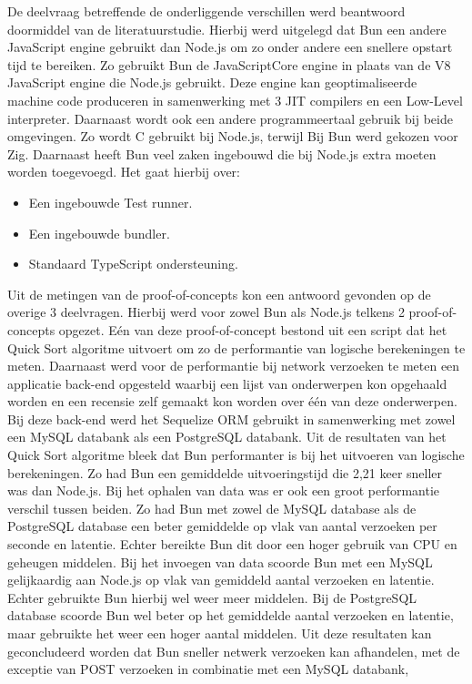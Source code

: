 De deelvraag betreffende de onderliggende verschillen werd beantwoord doormiddel van de literatuurstudie.
Hierbij werd uitgelegd dat Bun een andere JavaScript engine gebruikt dan Node.js om zo onder andere een snellere opstart tijd te bereiken.
Zo gebruikt Bun de JavaScriptCore engine in plaats van de V8 JavaScript engine die Node.js gebruikt.
Deze engine kan geoptimaliseerde machine code produceren in samenwerking met 3 JIT compilers en een Low-Level interpreter.
Daarnaast wordt ook een andere programmeertaal gebruik bij beide omgevingen. Zo wordt C gebruikt bij Node.js, terwijl Bij Bun werd gekozen voor Zig.
Daarnaast heeft Bun veel zaken ingebouwd die bij Node.js extra moeten worden toegevoegd.
Het gaat hierbij over:
\begin{itemize}
    \item Een ingebouwde Test runner.
    \item Een ingebouwde bundler.
    \item Standaard TypeScript ondersteuning.
\end{itemize}
Uit de metingen van de proof-of-concepts kon een antwoord gevonden op de overige 3 deelvragen.
Hierbij werd voor zowel Bun als Node.js telkens 2 proof-of-concepts opgezet. 
Eén van deze proof-of-concept bestond uit een script dat het Quick Sort algoritme uitvoert om zo de performantie van logische berekeningen te meten.
Daarnaast werd voor de performantie bij network verzoeken te meten een applicatie back-end opgesteld waarbij 
een lijst van onderwerpen kon opgehaald worden en een recensie zelf gemaakt kon worden over één van deze onderwerpen.
Bij deze back-end werd het Sequelize ORM gebruikt in samenwerking met zowel een MySQL databank als een PostgreSQL databank.
Uit de resultaten van het Quick Sort algoritme bleek dat Bun performanter is bij het uitvoeren van logische berekeningen.
Zo had Bun een gemiddelde uitvoeringstijd die 2,21 keer sneller was dan Node.js.
Bij het ophalen van data was er ook een groot performantie verschil tussen beiden. Zo had Bun met zowel de MySQL database als de PostgreSQL database 
een beter gemiddelde op vlak van aantal verzoeken per seconde en latentie. Echter bereikte Bun dit door een hoger gebruik van CPU en geheugen middelen.
Bij het invoegen van data scoorde Bun met een MySQL gelijkaardig aan Node.js op vlak van gemiddeld aantal verzoeken en latentie.
Echter gebruikte Bun hierbij wel weer meer middelen. Bij de PostgreSQL database scoorde Bun wel beter op het gemiddelde aantal verzoeken en latentie,
maar gebruikte het weer een hoger aantal middelen.
Uit deze resultaten kan geconcludeerd worden dat Bun sneller netwerk verzoeken kan afhandelen, met de exceptie van POST verzoeken in combinatie met een MySQL databank,
